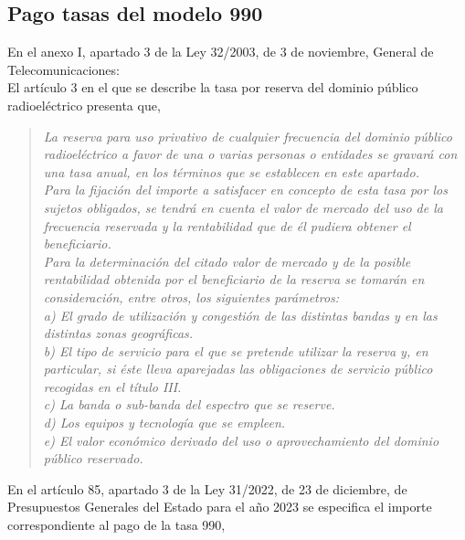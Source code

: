 \subsection{Pago tasas del modelo 990}
En el anexo I, apartado 3 de la Ley 32/2003, de 3 de noviembre, General de Telecomunicaciones:\\

El artículo 3 en el que se describe la tasa por reserva del dominio público radioeléctrico presenta que,
\begin{quote}
\itshape
La reserva para uso privativo de cualquier frecuencia del dominio público radioeléctrico a favor de una o varias personas o entidades se gravará con una tasa anual, en los términos que se establecen en este apartado.\\
Para la fijación del importe a satisfacer en concepto de esta tasa por los sujetos obligados, se tendrá en cuenta el valor de mercado del uso de la frecuencia reservada y la rentabilidad que de él pudiera obtener el beneficiario.\\
Para la determinación del citado valor de mercado y de la posible rentabilidad obtenida por el beneficiario de la reserva se tomarán en consideración, entre otros, los siguientes parámetros:\\
a) El grado de utilización y congestión de las distintas bandas y en las distintas zonas geográficas.\\
b) El tipo de servicio para el que se pretende utilizar la reserva y, en particular, si éste lleva aparejadas las obligaciones de servicio público recogidas en el título III.\\
c) La banda o sub-banda del espectro que se reserve.\\
d) Los equipos y tecnología que se empleen.\\
e) El valor económico derivado del uso o aprovechamiento del dominio público reservado.
\end{quote}
En el artículo 85, apartado 3 de la Ley 31/2022, de 23 de diciembre, de Presupuestos Generales del Estado para el año 2023 se especifica el importe correspondiente al pago de la tasa 990, \\
